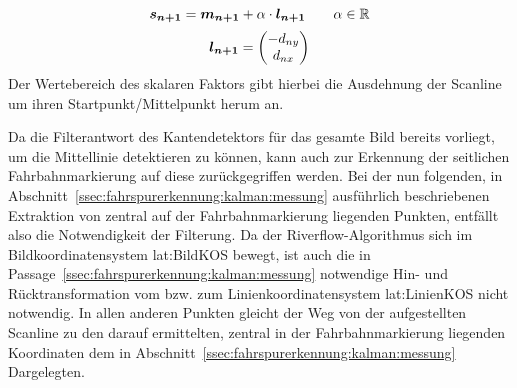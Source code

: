 \begin{equation}
\label{eq:riverflow:solidline:scanlinecontinous}
\boldsymbol{s_{n+1}} =
\boldsymbol{m_{n+1}}  + \alpha \cdot \boldsymbol{l_{n+1}}
\qquad \alpha \in \mathbb{R}
\end{equation}
\begin{equation}
\label{eq:riverflow:solidline:scanlinedirectionvec}
\boldsymbol{l_{n+1}} =
\begin{pmatrix}
-d_{ny} \\
d_{nx}
\end{pmatrix}
\end{equation}
Der Wertebereich des skalaren Faktors \scl{\alpha} gibt hierbei die Ausdehnung der Scanline um ihren Startpunkt/Mittelpunkt  herum an.

Da die Filterantwort des Kantendetektors für das gesamte Bild bereits vorliegt, um die Mittellinie detektieren zu können, kann auch zur Erkennung der seitlichen Fahrbahnmarkierung auf diese zurückgegriffen werden. Bei der nun folgenden, in Abschnitt~\ref{ssec:fahrspurerkennung:kalman:messung} ausführlich beschriebenen Extraktion von zentral auf der Fahrbahnmarkierung liegenden Punkten, entfällt also die Notwendigkeit der Filterung. Da der Riverflow-Algorithmus sich im Bildkoordinatensystem \gls{lat:BildKOS} bewegt, ist auch die in Passage~\ref{ssec:fahrspurerkennung:kalman:messung} notwendige Hin- und Rücktransformation vom bzw. zum Linienkoordinatensystem \gls{lat:LinienKOS} nicht notwendig. In allen anderen Punkten gleicht der Weg von der aufgestellten Scanline  zu den darauf ermittelten, zentral in der Fahrbahnmarkierung liegenden Koordinaten  dem in Abschnitt~\ref{ssec:fahrspurerkennung:kalman:messung} Dargelegten.

